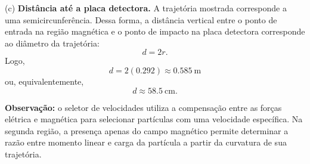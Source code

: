 \begin{questao}[4]{}
{(c) \textbf{Distância até a placa detectora.}
A trajetória mostrada corresponde a uma semicircunferência. Dessa forma, a
distância vertical entre o ponto de entrada na região magnética e o ponto de
impacto na placa detectora corresponde ao diâmetro da trajetória:
\[
d=2r.
\]
Logo,
\[
d=2(0.292)
\approx
\boxed{\SI{0.585}{\meter}}
\]
ou, equivalentemente,
\[
\boxed{d\approx\SI{58.5}{\centi\meter}}.
\]

\textbf{Observação:} o seletor de velocidades utiliza a compensação entre as
forças elétrica e magnética para selecionar partículas com uma velocidade
específica. Na segunda região, a presença apenas do campo magnético permite
determinar a razão entre momento linear e carga da partícula a partir da
curvatura de sua trajetória.
}
\end{questao}




